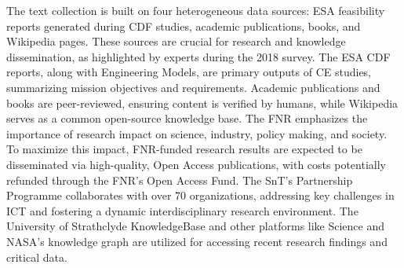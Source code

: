 \documentclass{article}
\begin{document}
The text collection is built on four heterogeneous data sources: ESA feasibility reports generated during CDF studies, academic publications, books, and Wikipedia pages. These sources are crucial for research and knowledge dissemination, as highlighted by experts during the 2018 survey. The ESA CDF reports, along with Engineering Models, are primary outputs of CE studies, summarizing mission objectives and requirements. Academic publications and books are peer-reviewed, ensuring content is verified by humans, while Wikipedia serves as a common open-source knowledge base. The FNR emphasizes the importance of research impact on science, industry, policy making, and society. To maximize this impact, FNR-funded research results are expected to be disseminated via high-quality, Open Access publications, with costs potentially refunded through the FNR’s Open Access Fund. The SnT’s Partnership Programme collaborates with over 70 organizations, addressing key challenges in ICT and fostering a dynamic interdisciplinary research environment. The University of Strathclyde KnowledgeBase and other platforms like Science and NASA's knowledge graph are utilized for accessing recent research findings and critical data.
\end{document}
